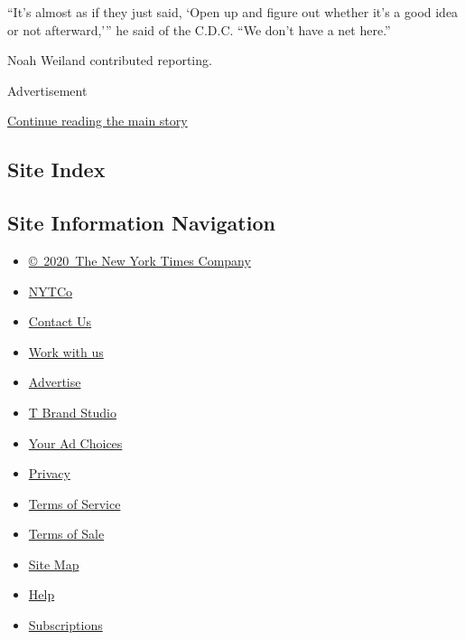 ``It's almost as if they just said, `Open up and figure out whether it's
a good idea or not afterward,''' he said of the C.D.C. ``We don't have a
net here.''

Noah Weiland contributed reporting.

Advertisement

\protect\hyperlink{after-bottom}{Continue reading the main story}

\hypertarget{site-index}{%
\subsection{Site Index}\label{site-index}}

\hypertarget{site-information-navigation}{%
\subsection{Site Information
Navigation}\label{site-information-navigation}}

\begin{itemize}
\tightlist
\item
  \href{https://help.nytimes3xbfgragh.onion/hc/en-us/articles/115014792127-Copyright-notice}{©~2020~The
  New York Times Company}
\end{itemize}

\begin{itemize}
\tightlist
\item
  \href{https://www.nytco.com/}{NYTCo}
\item
  \href{https://help.nytimes3xbfgragh.onion/hc/en-us/articles/115015385887-Contact-Us}{Contact
  Us}
\item
  \href{https://www.nytco.com/careers/}{Work with us}
\item
  \href{https://nytmediakit.com/}{Advertise}
\item
  \href{http://www.tbrandstudio.com/}{T Brand Studio}
\item
  \href{https://www.nytimes3xbfgragh.onion/privacy/cookie-policy\#how-do-i-manage-trackers}{Your
  Ad Choices}
\item
  \href{https://www.nytimes3xbfgragh.onion/privacy}{Privacy}
\item
  \href{https://help.nytimes3xbfgragh.onion/hc/en-us/articles/115014893428-Terms-of-service}{Terms
  of Service}
\item
  \href{https://help.nytimes3xbfgragh.onion/hc/en-us/articles/115014893968-Terms-of-sale}{Terms
  of Sale}
\item
  \href{https://spiderbites.nytimes3xbfgragh.onion}{Site Map}
\item
  \href{https://help.nytimes3xbfgragh.onion/hc/en-us}{Help}
\item
  \href{https://www.nytimes3xbfgragh.onion/subscription?campaignId=37WXW}{Subscriptions}
\end{itemize}
